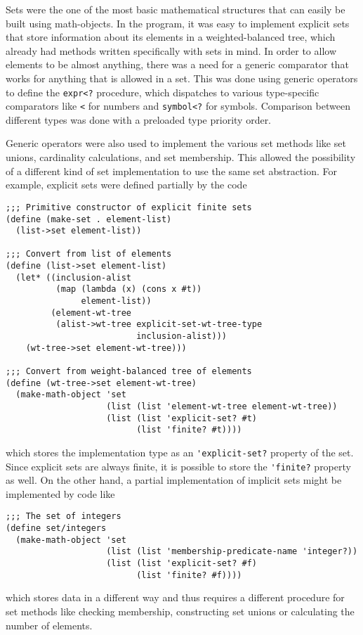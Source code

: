 \documentclass{article}
\begin{document}
            Sets were the one of the most basic mathematical structures that can easily be built using math-objects. In the program, it was easy to implement explicit sets that store information about its elements in a weighted-balanced tree, which already had methods written specifically with sets in mind. In order to allow elements to be almost anything, there was a need for a generic comparator that works for anything that is allowed in a set. This was done using generic operators to define the \verb+expr<?+ procedure, which dispatches to various type-specific comparators like \verb+<+ for numbers and \verb+symbol<?+ for symbols. Comparison between different types was done with a preloaded type priority order.
            
            Generic operators were also used to implement the various set methods like set unions, cardinality calculations, and set membership. This allowed the possibility of a different kind of set implementation to use the same set abstraction. For example, explicit sets were defined partially by the code
\begin{verbatim}
;;; Primitive constructor of explicit finite sets
(define (make-set . element-list)
  (list->set element-list))

;;; Convert from list of elements
(define (list->set element-list)
  (let* ((inclusion-alist
          (map (lambda (x) (cons x #t))
               element-list))
         (element-wt-tree
          (alist->wt-tree explicit-set-wt-tree-type
                          inclusion-alist)))
    (wt-tree->set element-wt-tree)))

;;; Convert from weight-balanced tree of elements
(define (wt-tree->set element-wt-tree)
  (make-math-object 'set
                    (list (list 'element-wt-tree element-wt-tree))
                    (list (list 'explicit-set? #t)
                          (list 'finite? #t))))
\end{verbatim}
            which stores the implementation type as an \verb+'explicit-set?+ property of the set. Since explicit sets are always finite, it is possible to store the \verb+'finite?+ property as well. On the other hand, a partial implementation of implicit sets might be implemented by code like
\begin{verbatim}
;;; The set of integers
(define set/integers
  (make-math-object 'set
                    (list (list 'membership-predicate-name 'integer?))
                    (list (list 'explicit-set? #f)
                          (list 'finite? #f))))
\end{verbatim}
            which stores data in a different way and thus requires a different procedure for set methods like checking membership, constructing set unions or calculating the number of elements.
            
\end{document}

